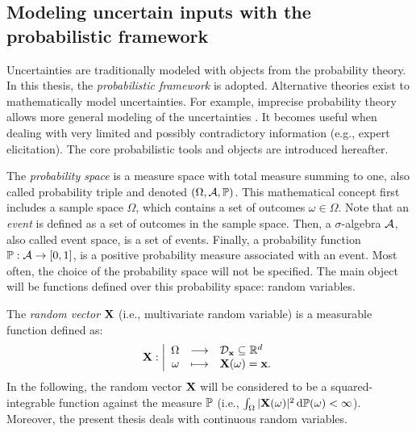\subsection{Modeling uncertain inputs with the probabilistic framework}

Uncertainties are traditionally modeled with objects from the probability theory. 
In this thesis, the \textit{probabilistic framework} is adopted. 
Alternative theories exist to mathematically model uncertainties. 
For example, imprecise probability theory allows more general modeling of the uncertainties \citep{beer_2013_imprecise_proba,schobi_sudret_2017_pbox}. 
It becomes useful when dealing with very limited and possibly contradictory information (e.g., expert elicitation). 
The core probabilistic tools and objects are introduced hereafter. 

The \textit{probability space} is a measure space with total measure summing to one, also called probability triple and denoted $(\Omega, \iA, \P)$. 
This mathematical concept first includes a sample space $\Omega$, which contains a set of outcomes $\omega \in \Omega$. 
Note that an \textit{event} is defined as a set of outcomes in the sample space. 
Then, a $\sigma$-algebra $\iA$, also called event space, is a set of events. 
Finally, a probability function $\P: \iA \rightarrow [0, 1]$, is a positive probability measure associated with an event. 
Most often, the choice of the probability space will not be specified. 
The main object will be functions defined over this probability space: random variables. 

The \textit{random vector} $\bX$ (i.e., multivariate random variable) is a measurable function defined as: 
\begin{equation}
\bX : \bigg|
\begin{array}{rcl}
    \Omega & \longrightarrow & \iD_{\bx} \subseteq \R^d\\
    \omega & \longmapsto & \bX(\omega) = \bx.
\end{array}
\end{equation}
In the following, the random vector $\bX$ will be considered to be a squared-integrable function against the measure $\P$ (i.e., $\int_{\Omega} |\bX(\omega)|^2 \,\dd \P(\omega) < \infty$). 
Moreover, the present thesis deals with continuous random variables.

